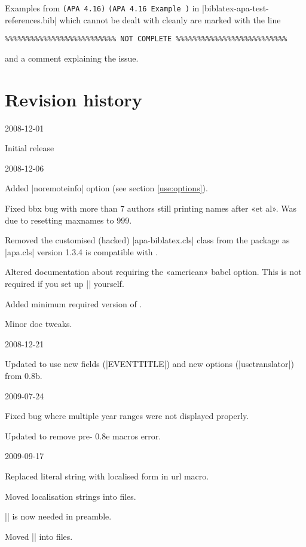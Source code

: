 \documentclass{ltxdockit}
\newcommand\apa[2][]{\ifthenelse{\equal{#1}{}}%
                       {\texttt{(APA #2)}}%
                       {\texttt{(APA #2 Example #1)}}}
\begin{document}
\noindent Examples from \apa{4.16} in |biblatex-apa-test-references.bib|
which cannot be dealt with cleanly are marked with the line

\begin{verbatim}
%%%%%%%%%%%%%%%%%%%%%%%%%% NOT COMPLETE %%%%%%%%%%%%%%%%%%%%%%%%%%
\end{verbatim}

\noindent and a comment explaining the issue.

\section{Revision history}

\begin{changelog}

\begin{release}{0.1}{2008-12-01}
\item Initial release
\end{release}

\begin{release}{0.2}{2008-12-06}
\item Added |noremoteinfo| option (see section \ref{use:options}).
\item Fixed bbx bug with more than 7 authors still printing names after «et al». Was
  due to resetting maxnames to 999.
\item Removed the customised (hacked) |apa-biblatex.cls| class from the package as
  |apa.cls| version 1.3.4 is compatible with .
\item Altered documentation about requiring the «american» babel option.
  This is not required if you set up |\DeclareQuotePunctuation| yourself.
\item Added minimum required version of .
\item Minor doc tweaks.
\end{release}

\begin{release}{0.3}{2008-12-21}
\item Updated to use new fields (|EVENTTITLE|) and new options
  (|usetranslator|) from  0.8b.
\end{release}

\begin{release}{0.4}{2009-07-24}
\item Fixed bug where multiple year ranges were not displayed properly.
\item Updated to remove pre- 0.8e macros error.
\end{release}

\begin{release}{0.5}{2009-09-17}
\item Replaced literal string with localised form in url macro.
\item Moved localisation strings into  files.
\item |\DeclareLanguageMapping| is now needed in preamble.
\item Moved |\DeclareBibliographyExtras| into  files.
\end{release}


\end{changelog}
\end{document}
